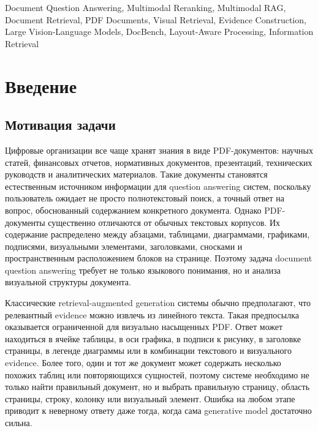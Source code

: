 \documentclass[conference]{IEEEtran}
\begin{document}
\begin{IEEEkeywords}
Document Question Answering, Multimodal Reranking, Multimodal RAG, Document Retrieval, PDF Documents, Visual Retrieval, Evidence Construction, Large Vision-Language Models, DocBench, Layout-Aware Processing, Information Retrieval
\end{IEEEkeywords}

\section{Введение}

\subsection{Мотивация задачи}

Цифровые организации все чаще хранят знания в виде PDF-документов: научных статей, финансовых отчетов, нормативных документов, презентаций, технических руководств и аналитических материалов. Такие документы становятся естественным источником информации для question answering систем, поскольку пользователь ожидает не просто полнотекстовый поиск, а точный ответ на вопрос, обоснованный содержанием конкретного документа. Однако PDF-документы существенно отличаются от обычных текстовых корпусов. Их содержание распределено между абзацами, таблицами, диаграммами, графиками, подписями, визуальными элементами, заголовками, сносками и пространственным расположением блоков на странице. Поэтому задача document question answering требует не только языкового понимания, но и анализа визуальной структуры документа.

Классические retrieval-augmented generation системы обычно предполагают, что релевантный evidence можно извлечь из линейного текста. Такая предпосылка оказывается ограниченной для визуально насыщенных PDF. Ответ может находиться в ячейке таблицы, в оси графика, в подписи к рисунку, в заголовке страницы, в легенде диаграммы или в комбинации текстового и визуального evidence. Более того, один и тот же документ может содержать несколько похожих таблиц или повторяющихся сущностей, поэтому системе необходимо не только найти правильный документ, но и выбрать правильную страницу, область страницы, строку, колонку или визуальный элемент. Ошибка на любом этапе приводит к неверному ответу даже тогда, когда сама generative model достаточно сильна.
\end{document}
